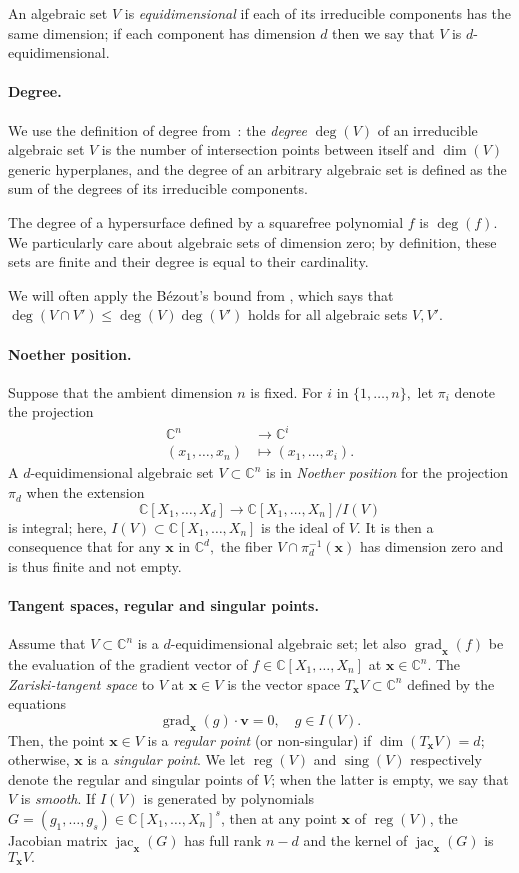 \documentclass[12pt]{article}
\def\xb{{\bm x}}
\DeclareMathOperator{\sing}{sing}
\DeclareMathOperator{\jac}{jac}
\DeclareMathOperator{\grad}{grad}
\DeclareMathOperator{\reg}{reg}
\def\C{\mathbb{C}}
\begin{document}
An algebraic set $V$ is \textit{equidimensional} if each of its
irreducible components has the same dimension; if each component has
dimension $d$ then we say that $V$ is $d$-equidimensional.

\paragraph*{Degree.}
We use the definition of degree from~\cite{H}: the \textit{degree}
$\deg(V)$ of an irreducible algebraic set $V$ is the number of
intersection points between itself and $\dim (V)$ generic hyperplanes,
and the degree of an arbitrary algebraic set is defined as the sum of
the degrees of its irreducible components.

The degree of a hypersurface defined by a squarefree polynomial $f$ is
$\deg(f)$. We particularly care about algebraic sets of dimension zero; by
definition, these sets are finite and their degree is equal to their
cardinality.

We will often apply the B\'ezout’s bound from \cite[Theorem 1]{H},
which says that $\deg(V \cap V') \le \deg(V) \deg(V')$ holds for all
algebraic sets $V,V'$.

\paragraph*{Noether position.}
Suppose that the ambient dimension $n$ is fixed.  For $i$ in
$\{1,\dots,n\},$ let $\pi_i$ denote the projection
\begin{align*}
\C^n  &\rightarrow \C^i \\
(x_1,\hdots,x_n) &\mapsto  (x_1,\hdots,x_i).    
\end{align*} 
A $d$-equidimensional algebraic set $V \subset \C^n$ is in
\textit{Noether position} for the projection $\pi_d$ when the
extension \[\C[X_1,\hdots,X_{d}] \rightarrow \C[X_1,\hdots,X_n]/I(V)\]
is integral; here, $I(V) \subset \C[X_1,\hdots,X_n]$ is the ideal of
$V$. It is then a consequence that for any $\xb$ in $\C^d,$ the fiber
$V \cap \pi_d^{-1}(\xb)$ has dimension zero and is thus finite and not
empty.

\paragraph*{Tangent spaces, regular and singular points.}
Assume that $V \subset \C^n$ is a $d$-equidimen\-sional algebraic set;
let also $\grad_{\xb}(f)$ be the evaluation of the gradient vector of
$f \in \C[X_1,\hdots,X_n]$ at $\xb \in \C^n$. The
\textit{Zariski-tangent space} to $V$ at $\xb \in V$ is the vector
space $T_{\xb}V \subset \C^n$ defined by the equations
\[
\grad_{\xb} (g) \cdot \bm v = 0, \quad g \in I(V).
\] 
Then, the point $\xb \in V$ is a \textit{regular point} (or
non-singular) if $\dim (T_{\xb}V) = d$; otherwise, $\xb$ is a
\textit{singular point}. We let $\reg(V)$ and $\sing(V)$ respectively
denote the regular and singular points of $V$; when the latter is
empty, we say that $V$ is \textit{smooth}. If $I(V)$ is generated by
polynomials $G=(g_1,\hdots,g_s) \in \C[X_1,\hdots,X_n]^s$, then at any
point $\xb$ of $\reg(V)$, the Jacobian matrix $\jac_{\xb}(G)$ has full
rank $n - d$ and the kernel of $\jac_{\xb}(G)$ is $T_{\xb}V.$
\end{document}
